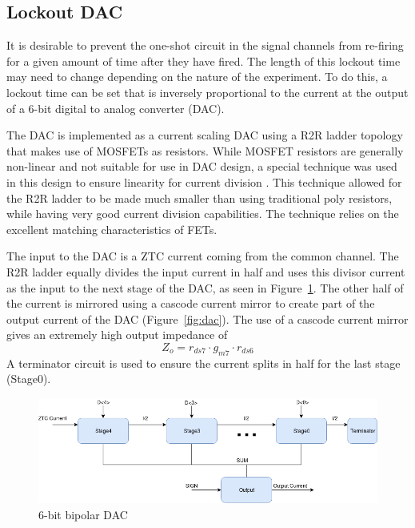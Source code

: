 \documentclass[12pt,oneside,final]{siuethesis}
\theoremstyle{definition}
\begin{document}
\subsection{Lockout DAC}
\par It is desirable to prevent the one-shot circuit in the signal channels from re-firing for a given amount of time after they have fired. The length of this lockout time may need to change depending on the nature of the experiment. To do this, a lockout time can be set that is inversely proportional to the current at the output of a 6-bit digital to analog converter (DAC). 
\par The DAC is implemented as a current scaling DAC using a R2R ladder topology \cite{BAKER} that makes use of MOSFETs as resistors. While MOSFET resistors are generally non-linear and not suitable for use in DAC design, a special technique was used in this design to ensure linearity for current division \cite{DAC}. This technique allowed for the R2R ladder to be made much smaller than using traditional poly resistors, while having very good current division capabilities. The technique relies on the excellent matching characteristics of FETs.
\par The input to the DAC is a ZTC current coming from the common channel. The R2R ladder equally divides the input current in half and uses this divisor current as the input to the next stage of the DAC, as seen in Figure~\ref{fig:dac-block}. The other half of the current is mirrored using a cascode current mirror to create part of the output current of the DAC (Figure~\ref{fig:dac}). The use of a cascode current mirror gives an extremely high output impedance of 
\begin{equation}
Z_{o} = r_{ds7}\cdot g_{m7} \cdot r_{ds6}
\end{equation} 
A terminator circuit is used to ensure the current splits in half for the last stage (Stage0).

\begin{figure}[htbp!]
\centering
\includegraphics[scale=.55,keepaspectratio=true]{./ch3_figures/dac.png} 
\caption{6-bit bipolar DAC}
\label{fig:dac-block}
\end{figure}
\end{document}
